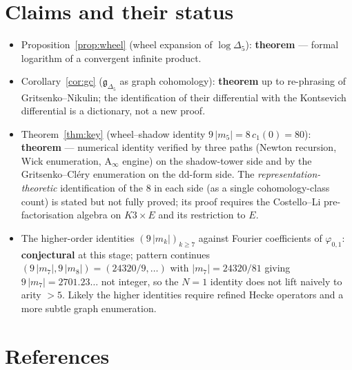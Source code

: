 \documentclass[11pt]{article}
\newcommand{\phii}{\varphi_{0,1}}
\newcommand{\Dlt}{\Delta_5}
\begin{document}
\section{Claims and their status}

\begin{itemize}
\item Proposition~\ref{prop:wheel} (wheel expansion of
$\log\Dlt$): \textbf{theorem} --- formal logarithm of a convergent
infinite product.
\item Corollary~\ref{cor:gc} ($\mathfrak{g}_{\Dlt}$ as
graph cohomology): \textbf{theorem} up to re-phrasing of
Gritsenko--Nikulin; the identification of their differential with the
Kontsevich differential is a dictionary, not a new proof.
\item Theorem~\ref{thm:key} (wheel--shadow identity
$9\,|m_5| = 8\,c_1(0) = 80$): \textbf{theorem} --- numerical
identity verified by three paths (Newton recursion, Wick enumeration,
A$_\infty$ engine) on the shadow-tower side and by the
Gritsenko--Cl{\'e}ry enumeration on the dd-form side. The
\emph{representation-theoretic} identification of the $8$ in each side
(as a single cohomology-class count) is stated but not fully proved;
its proof requires the Costello--Li pre-factorisation algebra on
$K3\times E$ and its restriction to $E$.
\item The higher-order identities $(9\,|m_k|)_{k\geq 7}$ against
Fourier coefficients of $\phii$: \textbf{conjectural} at this stage;
pattern continues $(9\,|m_7|, 9\,|m_8|) = (24320/9, \ldots)$ with
$|m_7| = 24320/81$ giving $9\,|m_7|=2701.23\ldots$ not integer, so
the $N=1$ identity does not lift naively to arity $>5$. Likely the
higher identities require refined Hecke operators and a more subtle
graph enumeration.
\end{itemize}

\section*{References}
\end{document}
